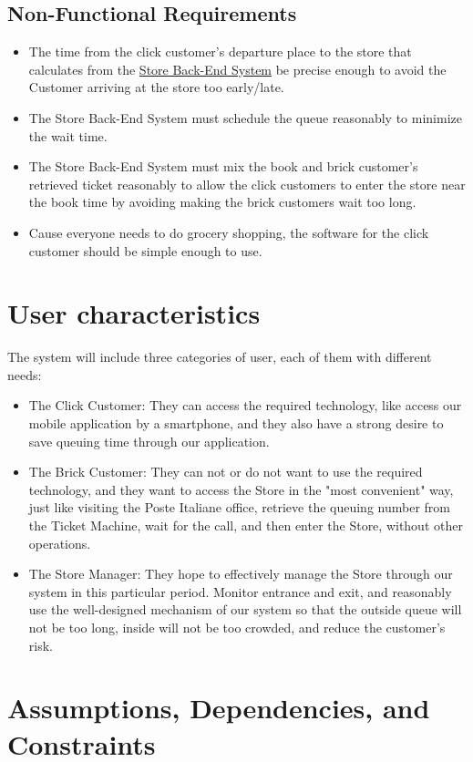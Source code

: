 \documentclass[a4paper,12pt]{report}
\begin{document}
\subsection{Non-Functional Requirements}
\begin{itemize}
	\item The time from the click customer's departure place to the store that calculates from the \hyperref[Definitions]{Store Back-End System} be precise enough to avoid the Customer arriving at the store too early/late.
	\item The Store Back-End System must schedule the queue reasonably to minimize the wait time.
	\item The Store Back-End System must mix the book and brick customer's retrieved ticket reasonably to allow the click customers to enter the store near the book time by avoiding making the brick customers wait too long.
	\item Cause everyone needs to do grocery shopping, the software for the click customer should be simple enough to use.
\end{itemize}


\section{User characteristics}
The system will include three categories of user, each of them with different needs:
\begin{itemize}
	\item The Click Customer: They can access the required technology, like access our mobile application by a smartphone, and they also have a strong desire to save queuing time through our application.
	\item The Brick Customer: They can not or do not want to use the required technology, and they want to access the Store in the "most convenient" way, just like visiting the Poste Italiane office, retrieve the queuing number from the Ticket Machine, wait for the call, and then enter the Store, without other operations.
	\item The Store Manager: They hope to effectively manage the Store through our system in this particular period. Monitor entrance and exit, and reasonably use the well-designed mechanism of our system so that the outside queue will not be too long, inside will not be too crowded, and reduce the customer's risk.
\end{itemize}


\section{Assumptions, Dependencies, and Constraints}
\end{document}
